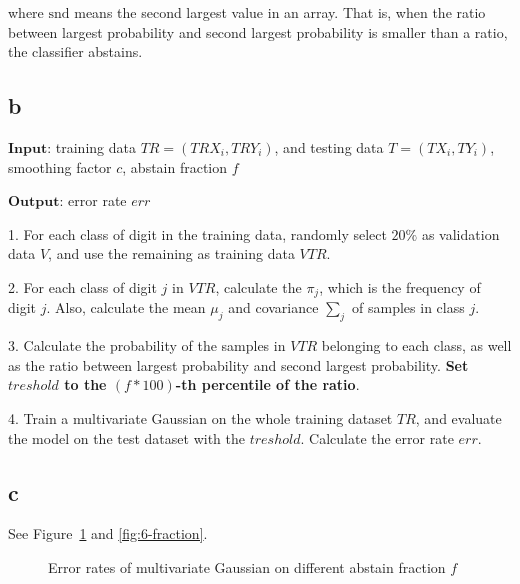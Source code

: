 \documentclass[a4paper,11pt]{article}
\theoremstyle{mytheor}
\begin{document}
where $\text{snd}$ means the second largest value in an array. That is, when the ratio between largest probability and second largest probability is smaller than a ratio, the classifier abstains.


\subsection*{b}
$\mathbf{Input}$: training data $TR = (TRX_i, TRY_i)$, and testing data $T = (TX_i, TY_i)$, smoothing factor $c$, abstain fraction $f$

$\mathbf{Output}$: error rate $err$

1. For each class of digit in the training data, randomly select $20\%$ as validation data $V$, and use the remaining as training data $VTR$.

2. For each class of digit $j$ in $VTR$, calculate the $\pi_j$, which is the frequency of digit $j$. Also, calculate the mean $\mu_j$ and covariance $\sum_{j}$ of samples in class $j$.

3. Calculate the probability of the samples in $VTR$ belonging to each class,
as well as the ratio between largest probability and second largest probability.
\textbf{Set $treshold$ to the $(f*100)$-th percentile of the ratio}. 

4. Train a multivariate Gaussian on the whole training dataset $TR$, and evaluate the model on the test dataset with the $treshold$. Calculate the error rate $err$.

\subsection*{c}
See Figure~\ref{fig:6-error} and \ref{fig:6-fraction}.

\begin{figure}[h]
	\caption{Error rates of multivariate Gaussian on different abstain fraction $f$}
	\label{fig:6-error}
\end{figure}
\end{document}
